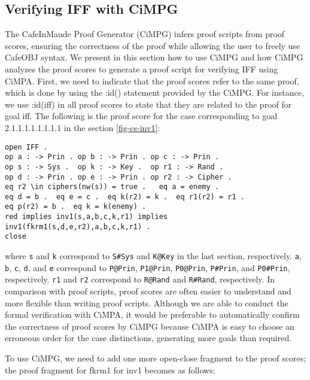 \documentclass[a4paper,fleqn]{cas-dc}
\begin{document}
\subsection{Verifying IFF with CiMPG} \label{cimpg}
The CafeInMaude Proof Generator (CiMPG) infers proof scripts from proof scores, ensuring the correctness of the proof while allowing the user to freely use CafeOBJ syntax. We present in this section how to use CiMPG and how CiMPG analyzes the proof scores to generate a proof script for verifying IFF using CiMPA. 
First, we need to indicate that the proof scores refer to the same proof, which is done by using the :id() statement provided by the CiMPG. For instance, we use :id(iff) in all
proof scores to state that they are related to the proof for goal iff. 
The following is the proof score for the case corresponding to goal 2.1.1.1.1.1.1.1.1 in the section \ref{fig-cs-inv1}:
\begin{small}
\begin{verbatim}
open IFF .
op a : -> Prin . op b : -> Prin . op c : -> Prin .
op s : -> Sys .  op k : -> Key .  op r1 : -> Rand .
op d : -> Prin . op e : -> Prin . op r2 : -> Cipher .
eq r2 \in ciphers(nw(s)) = true .   eq a = enemy .
eq d = b .  eq e = c .  eq k(r2) = k .  eq r1(r2) = r1 .    
eq p(r2) = b .  eq k = k(enemy) .
red implies inv1(s,a,b,c,k,r1) implies
inv1(fkrm1(s,d,e,r2),a,b,c,k,r1) .
close
\end{verbatim}
\end{small}
\noindent
where \verb!s! and \verb!k! correspond to \verb!S#Sys! and \verb!K@Key! in the last section, respectively.
\verb!a!, \verb!b!, \verb!c!, \verb!d!, and \verb!e! correspond to \verb!P@Prin!, \verb!P1@Prin!, \verb!P0@Prin!, \verb!P#Prin!, and \verb!P0#Prin!, respectively. \verb!r1! and \verb!r2! correspond to \verb!R@Rand! and \verb!R#Rand!, respectively.
In comparison with proof scripts, proof scores are often easier to understand and more flexible than writing proof scripts. 
Although we are able to conduct the formal verification with
CiMPA, it would be preferable to automatically confirm the correctness of proof scores by CiMPG because CiMPA is easy to choose an erroneous order for the case distinctions, generating more goals than required. 

To use CiMPG, we need to add one more open-close fragment to the proof scores; the proof fragment for fkrm1 for inv1 becomes as follows:
\end{document}
